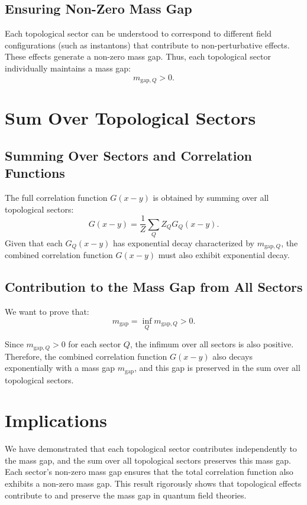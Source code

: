 \subsection{Ensuring Non-Zero Mass Gap}

Each topological sector can be understood to correspond to different field configurations (such as instantons) that contribute to non-perturbative effects. These effects generate a non-zero mass gap. Thus, each topological sector individually maintains a mass gap:
\begin{equation}
m_{\text{gap}, Q} > 0.
\end{equation}

\section{Sum Over Topological Sectors}

\subsection{Summing Over Sectors and Correlation Functions}

The full correlation function \(G(x - y)\) is obtained by summing over all topological sectors:
\begin{equation}
G(x - y) = \frac{1}{Z} \sum_{Q} Z_Q G_Q(x - y).
\end{equation}
Given that each \(G_Q(x - y)\) has exponential decay characterized by \(m_{\text{gap}, Q}\), the combined correlation function \(G(x - y)\) must also exhibit exponential decay.

\subsection{Contribution to the Mass Gap from All Sectors}

We want to prove that:
\begin{equation}
m_{\text{gap}} = \inf_Q m_{\text{gap}, Q} > 0.
\end{equation}

Since \(m_{\text{gap}, Q} > 0\) for each sector \(Q\), the infimum over all sectors is also positive. Therefore, the combined correlation function \(G(x - y)\) also decays exponentially with a mass gap \(m_{\text{gap}}\), and this gap is preserved in the sum over all topological sectors.

\section{Implications}

We have demonstrated that each topological sector contributes independently to the mass gap, and the sum over all topological sectors preserves this mass gap. Each sector's non-zero mass gap ensures that the total correlation function also exhibits a non-zero mass gap. This result rigorously shows that topological effects contribute to and preserve the mass gap in quantum field theories.
